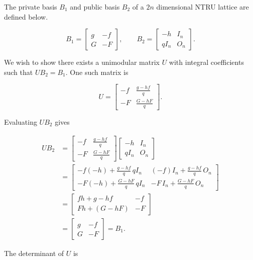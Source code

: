 The private basis $B_1$ and public basis $B_2$ of a $2n$ dimensional NTRU lattice are defined below. 

$$
B_1 =
\begin{bmatrix}
g & -f \\
G & -F
\end{bmatrix},
\qquad
B_2 =
\begin{bmatrix}
-h & I_n \\
qI_n & O_n
\end{bmatrix}.
$$

We wish to show there exists a unimodular matrix $U$ with integral coefficients such that $UB_2 = B_1$. One such matrix is 

$$
U =
\begin{bmatrix}
-f & \frac{g-hf}{q} \\
-F & \frac{G-hF}{q}
\end{bmatrix}.
$$


Evaluating $UB_2$ gives

$$
\begin{aligned}
U B_2
&=
\begin{bmatrix} -f & \frac{g-hf}{q} \\ -F & \frac{G-hF}{q} \end{bmatrix}
\begin{bmatrix} -h & I_n \\ qI_n & O_n \end{bmatrix}
\\[4pt]
&=
\begin{bmatrix}
-f(-h) + \frac{g-hf}{q}\, qI_n & (-f)I_n + \frac{g-hf}{q}\, O_n \\[4pt]
-F(-h) + \frac{G-hF}{q}\, qI_n & -F\, I_n + \frac{G-hF}{q}\, O_n
\end{bmatrix}
\\[4pt]
&=
\begin{bmatrix}
fh + g - hf & -f \\
Fh + (G-hF) & -F
\end{bmatrix}
\\[4pt]
&=
\begin{bmatrix} g & -f \\ G & -F \end{bmatrix}
= B_1 .
\end{aligned}
$$

The determinant of $U$ is 

